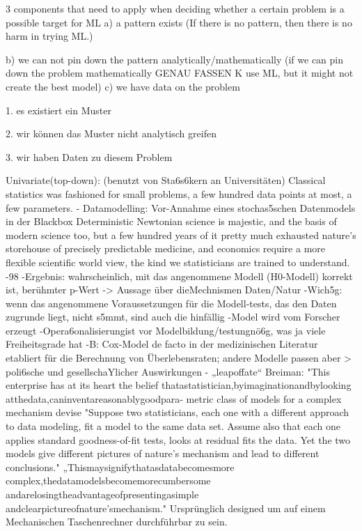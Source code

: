 \documentclass[authoryear,review,3p]{elsarticle}
\begin{document}
3 components that need to apply when deciding whether a certain problem is a possible target for ML a) a pattern exists (If there is no pattern, then there is no harm in trying ML.)

b) we can not pin down the pattern analytically/mathematically (if we can pin down the problem mathematically GENAU FASSEN K use ML, but it might not create the best model)
c) we have data on the problem



1. es existiert ein Muster

2. wir können das Muster nicht analytisch greifen

3. wir haben Daten zu diesem Problem



Univariate(top-down): (benutzt von Sta6s6kern an Universitäten)
Classical statistics was fashioned for small problems, a few hundred data points at most, a few parameters.
- Datamodelling: Vor-Annahme eines stochas5schen Datenmodels in der Blackbox
Deterministic Newtonian science is majestic, and the basis of modern science too, but a few hundred years of it pretty much exhausted nature’s storehouse of precisely predictable medicine, and economics require a more flexible scientific world view, the kind we statisticians are trained to understand.
-98%
-Ergebnis: wahrscheinlich, mit das angenommene Modell (H0-Modell) korrekt ist, berühmter p-Wert -> Aussage über dieMechnismen Daten/Natur
-Wich5g: wenn das angenommene Voraussetzungen für die Modell-tests, das den Daten zugrunde liegt, nicht s5mmt, sind auch die hinfällig
-Model wird vom Forscher erzeugt
-Opera6onalisierungist vor Modelbildung/testungnö6g, was ja viele Freiheitsgrade hat
-B: Cox-Model de facto in der medizinischen Literatur etabliert für die Berechnung von Überlebensraten; andere Modelle passen aber > poli6sche und gesellschaYlicher Auswirkungen
- „leapoffate“
Breiman: "This enterprise has at its heart the belief thatastatistician,byimaginationandbylooking atthedata,caninventareasonablygoodpara- metric class of models for a complex mechanism devise "Suppose two statisticians, each one with a different approach to data modeling, fit a model to the same data set. Assume also that each one applies standard goodness-of-fit tests, looks at residual fits the data. Yet the two models give different pictures of nature’s mechanism and lead to different conclusions."
„Thismaysignifythatasdatabecomesmore complex,thedatamodelsbecomemorecumbersome andarelosingtheadvantageofpresentingasimple andclearpictureofnature’smechanism." Ursprünglich designed um auf einem Mechanischen Taschenrechner durchführbar zu sein.
\end{document}
